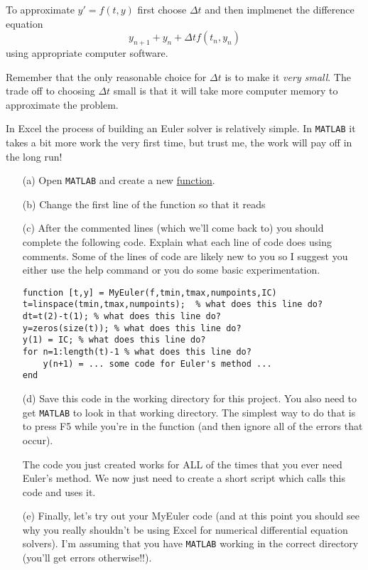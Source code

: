 \begin{technique}
    To approximate $y' = f(t,y)$ first choose $\Delta t$ and then implmenet the difference
    equation
    \[ y_{n+1} + y_n + \Delta t f(t_n,y_n) \]
    using appropriate computer software. 
\end{technique}
Remember that the only reasonable choice for
$\Delta t$ is to make it {\it very small}.  The trade off to choosing $\Delta t$ small
is that it will take more computer memory to approximate the problem.


\begin{problem}
    In Excel the process of building an Euler solver is relatively simple.  In \texttt{MATLAB}
it takes a bit more work the very first time, but trust me, the work will pay off in the
long run!
\begin{enumerate}
    \item[(a)] Open \texttt{MATLAB} and create a new \underline{function}.  
    \item[(b)] Change the first line of the function so that it reads \\
    \item[(c)] After the commented lines (which we'll come back to) you should complete the following
        code.  Explain what each line of code does using comments. Some of the lines of
        code are likely new to you so I suggest you either use the help command or you do
        some basic experimentation.
\begin{lstlisting}
function [t,y] = MyEuler(f,tmin,tmax,numpoints,IC)
t=linspace(tmin,tmax,numpoints);  % what does this line do?
dt=t(2)-t(1); % what does this line do?
y=zeros(size(t)); % what does this line do?
y(1) = IC; % what does this line do?
for n=1:length(t)-1 % what does this line do?
    y(n+1) = ... some code for Euler's method ...
end
\end{lstlisting}
    \item[(d)] Save this code in the working directory for this project.  You also need to
        get \texttt{MATLAB} to look in that working directory.  The simplest way to do
        that is to press F5 while you're in the  function (and then ignore all of
        the errors that occur).  

        The code you just created works for ALL of the times that you ever need Euler's
        method.  We now just need to create a short script which calls this code and uses
        it.
    \item[(e)] Finally, let's try out your MyEuler code (and at this point you should see why
        you really shouldn't be using Excel for numerical differential equation solvers).
        I'm assuming that you have \texttt{MATLAB} working in the correct directory
        (you'll get errors otherwise!!).  


\end{enumerate}
\end{problem}
